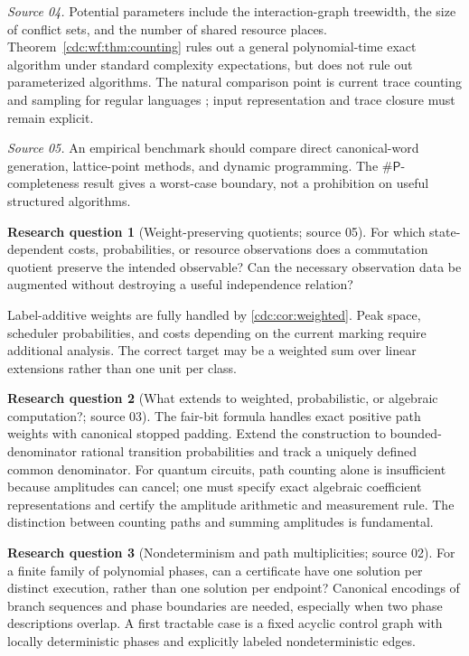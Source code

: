\documentclass[11pt,a4paper]{article}
\theoremstyle{definition}
\newtheorem{question}[question]{Research question}
\theoremstyle{remark}
\newcommand{\sharpP}{\mathsf{\#P}}
\begin{document}
\emph{Source 04.} Potential parameters include the interaction-graph treewidth, the size of conflict sets, and the number of shared resource places. Theorem~\ref{cdc:wf:thm:counting} rules out a general polynomial-time exact algorithm under standard complexity expectations, but does not rule out parameterized algorithms. The natural comparison point is current trace counting and sampling for regular languages \cite{decolnet2026}; input representation and trace closure must remain explicit.

\emph{Source 05.} An empirical benchmark should compare direct canonical-word generation, lattice-point methods, and dynamic programming. The $\sharpP$-completeness result gives a worst-case boundary, not a prohibition on useful structured algorithms.

\begin{question}[Weight-preserving quotients; source 05]
For which state-dependent costs, probabilities, or resource observations does a commutation quotient preserve the intended observable? Can the necessary observation data be augmented without destroying a useful independence relation?
\end{question}
Label-additive weights are fully handled by \cref{cdc:cor:weighted}. Peak space, scheduler probabilities, and costs depending on the current marking require additional analysis. The correct target may be a weighted sum over linear extensions rather than one unit per class.

\begin{question}[What extends to weighted, probabilistic, or algebraic computation?; source 03]
The fair-bit formula handles exact positive path weights with canonical stopped
padding. Extend the construction to bounded-denominator rational transition
probabilities and track a uniquely defined common denominator. For quantum
circuits, path counting alone is insufficient because amplitudes can cancel;
one must specify exact algebraic coefficient representations and certify the
amplitude arithmetic and measurement rule. The distinction between counting
paths and summing amplitudes is fundamental.
\end{question}

\begin{question}[Nondeterminism and path multiplicities; source 02]
For a finite family of polynomial phases, can a certificate have one
solution per distinct execution, rather than one solution per endpoint?
Canonical encodings of branch sequences and phase boundaries are needed,
especially when two phase descriptions overlap. A first tractable case is
a fixed acyclic control graph with locally deterministic phases and
explicitly labeled nondeterministic edges.
\end{question}
\end{document}

